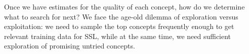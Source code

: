 Once we have estimates for the quality of each concept, how do we determine what to search for next?
We face the age-old dilemma of exploration versus exploitation:
we need to sample the top concepts frequently enough to get relevant training data for SSL, while at the same time, we need sufficient exploration of promising untried concepts.

